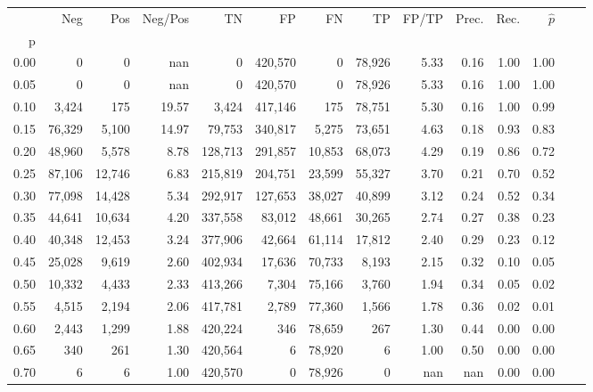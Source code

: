 \begin{tabular}{rrrrrrrrrrrrrr}
\toprule
{} &     Neg &     Pos & Neg/Pos &       TN &       FP &      FN &      TP & FP/TP & Prec. &  Rec. & $\hat{p}$ \\
p    &         &         &         &          &          &         &         &       &       &       &           \\
\midrule
0.00 &       0 &       0 &     nan &        0 &  420,570 &       0 &  78,926 &  5.33 &  0.16 &  1.00 &      1.00 \\
0.05 &       0 &       0 &     nan &        0 &  420,570 &       0 &  78,926 &  5.33 &  0.16 &  1.00 &      1.00 \\
0.10 &   3,424 &     175 &   19.57 &    3,424 &  417,146 &     175 &  78,751 &  5.30 &  0.16 &  1.00 &      0.99 \\
0.15 &  76,329 &   5,100 &   14.97 &   79,753 &  340,817 &   5,275 &  73,651 &  4.63 &  0.18 &  0.93 &      0.83 \\
0.20 &  48,960 &   5,578 &    8.78 &  128,713 &  291,857 &  10,853 &  68,073 &  4.29 &  0.19 &  0.86 &      0.72 \\
0.25 &  87,106 &  12,746 &    6.83 &  215,819 &  204,751 &  23,599 &  55,327 &  3.70 &  0.21 &  0.70 &      0.52 \\
0.30 &  77,098 &  14,428 &    5.34 &  292,917 &  127,653 &  38,027 &  40,899 &  3.12 &  0.24 &  0.52 &      0.34 \\
0.35 &  44,641 &  10,634 &    4.20 &  337,558 &   83,012 &  48,661 &  30,265 &  2.74 &  0.27 &  0.38 &      0.23 \\
0.40 &  40,348 &  12,453 &    3.24 &  377,906 &   42,664 &  61,114 &  17,812 &  2.40 &  0.29 &  0.23 &      0.12 \\
0.45 &  25,028 &   9,619 &    2.60 &  402,934 &   17,636 &  70,733 &   8,193 &  2.15 &  0.32 &  0.10 &      0.05 \\
0.50 &  10,332 &   4,433 &    2.33 &  413,266 &    7,304 &  75,166 &   3,760 &  1.94 &  0.34 &  0.05 &      0.02 \\
0.55 &   4,515 &   2,194 &    2.06 &  417,781 &    2,789 &  77,360 &   1,566 &  1.78 &  0.36 &  0.02 &      0.01 \\
0.60 &   2,443 &   1,299 &    1.88 &  420,224 &      346 &  78,659 &     267 &  1.30 &  0.44 &  0.00 &      0.00 \\
0.65 &     340 &     261 &    1.30 &  420,564 &        6 &  78,920 &       6 &  1.00 &  0.50 &  0.00 &      0.00 \\
0.70 &       6 &       6 &    1.00 &  420,570 &        0 &  78,926 &       0 &   nan &   nan &  0.00 &      0.00 \\

\end{tabular}

